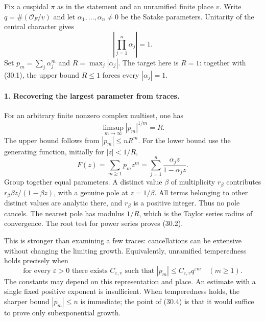 \documentclass[11pt]{article}
\begin{document}
Fix a cuspidal $\pi$ as in the statement and an unramified finite place $v$.
Write $q=\#(\mathcal O_F/v)$ and let
$\alpha_1,\ldots,\alpha_n\ne0$ be the Satake parameters. Unitarity of the
central character gives
\[
 \left|\prod_{j=1}^n\alpha_j\right|=1.
 \tag{30.1}
\]
Set $p_m=\sum_j\alpha_j^m$ and $R=\max_j|\alpha_j|$. The target here is
$R=1$: together with (30.1), the upper bound $R\leq1$ forces every
$|\alpha_j|=1$.

\paragraph{1. Recovering the largest parameter from traces.}
For an arbitrary finite nonzero complex multiset, one has
\[
 \limsup_{m\to\infty}|p_m|^{1/m}=R.
 \tag{30.2}
\]
The upper bound follows from $|p_m|\leq nR^m$. For the lower bound use the
generating function, initially for $|z|<1/R$,
\[
 F(z)=\sum_{m\geq1}p_mz^m
     =\sum_{j=1}^n\frac{\alpha_jz}{1-\alpha_jz}.
 \tag{30.3}
\]
Group together equal parameters. A distinct value $\beta$ of multiplicity
$r_\beta$ contributes $r_\beta\beta z/(1-\beta z)$, with a genuine pole at
$z=1/\beta$. All terms belonging to other distinct values are analytic
there, and $r_\beta$ is a positive integer. Thus no pole cancels. The nearest
pole has modulus $1/R$, which is the Taylor series radius of convergence.
The root test for power series proves (30.2).

This is stronger than examining a few traces: cancellations can be extensive
without changing the limiting growth. Equivalently, unramified temperedness
holds precisely when
\[
 \text{for every }\varepsilon>0\text{ there exists }C_{\varepsilon,v}
 \text{ such that }|p_m|\leq C_{\varepsilon,v}q^{\varepsilon m}
 \quad(m\geq1).
 \tag{30.4}
\]
The constants may depend on this representation and place. An estimate
with a single fixed positive exponent is insufficient. When temperedness
holds, the sharper bound $|p_m|\leq n$ is immediate; the point of (30.4)
is that it would suffice to prove only subexponential growth.
\end{document}
